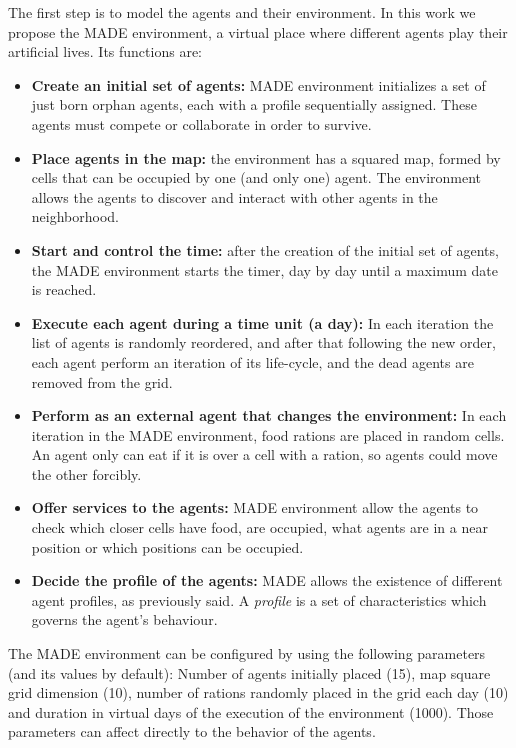 \documentclass{sig-alternate}
\begin{document}
The first step is to model the agents and their environment. In this work we propose the MADE environment, a virtual place where different agents play their artificial lives. Its functions are:

\begin{itemize}
\item \textbf{Create an initial set of agents:} MADE environment
  initializes a set of just born orphan agents, each with a profile
  sequentially assigned.
 These agents must compete or collaborate in order to survive.
\item \textbf{Place agents in the map:} the environment has a squared map, formed by cells that can be occupied by one (and only one) agent. The environment allows the agents to discover and interact with other agents in the neighborhood.
\item \textbf{Start and control the time:} after the creation of the initial set of agents, the MADE environment starts the timer, day by day until a maximum date is reached.
\item \textbf{Execute each agent during a time unit (a day):} In each iteration the list of agents is randomly reordered, and after that following the new order, each agent perform an iteration of its life-cycle, and the dead agents are removed from the grid.
\item \textbf{Perform as an external agent that changes the environment:} In each iteration in the MADE environment, food rations are placed in random cells. An agent only can eat if it is over a cell with a ration, so agents could move the other forcibly.
\item \textbf{Offer services to the agents:} MADE environment allow the agents to check which closer cells have food, are occupied, what agents are in a near position or which positions can be occupied.
\item \textbf{Decide the profile of the agents:} MADE allows the existence of different agent profiles, as previously said. A {\em profile} is a set of characteristics which governs the agent's behaviour.
\end{itemize}

The MADE environment can be configured by using the following parameters (and its values by default): Number of agents initially placed (15), map square grid dimension (10), number of rations randomly placed in the grid each day (10) and duration in virtual days of the  execution of the environment (1000). Those parameters can affect directly to the behavior of the agents.
\end{document}
